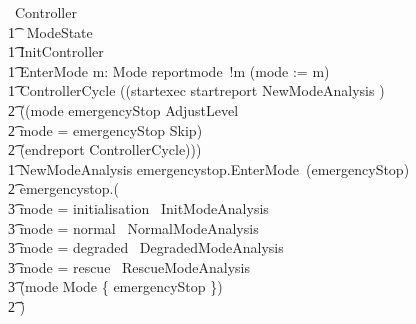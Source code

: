 \documentclass{report} %
\begin{document}
\begin{circus}
    \circprocess\ Controller \circdef \circbegin \\
        \t1 \circstate\ ModeState  \\
        \t1 InitController  \\
        \t1 EnterMode \circdef \circvar m: Mode \circspot reportmode~!m \then (mode := m) \\
        \t1 ControllerCycle \circdef ((startexec \then startreport \then NewModeAnalysis )\circseq\ \\
                \t2 ((\lcircguard mode \neq emergencyStop \rcircguard \circguard AdjustLevel \extchoice \\
                \t2 \lcircguard mode = emergencyStop \rcircguard \circguard Skip) \circseq \\
                \t2 (endreport \then ControllerCycle))) \\
        \t1 NewModeAnalysis \circdef emergencystop.\true \then EnterMode~(emergencyStop) \\
            \t2 \extchoice
            emergencystop.\false \then ( \\
                \t3 \lcircguard mode = initialisation \rcircguard \circguard\ InitModeAnalysis \\
                \t3 \extchoice \lcircguard mode = normal \rcircguard \circguard\ NormalModeAnalysis \\
                \t3 \extchoice \lcircguard mode = degraded \rcircguard \circguard\ DegradedModeAnalysis \\
                \t3 \extchoice \lcircguard mode = rescue \rcircguard \circguard\ RescueModeAnalysis \\
                \t3 \extchoice \lcircguard (mode \notin Mode \setminus \{ emergencyStop \}) \rcircguard \circguard\ \Skip \\
                \t2 ) \\

\end{circus}
\end{document}
